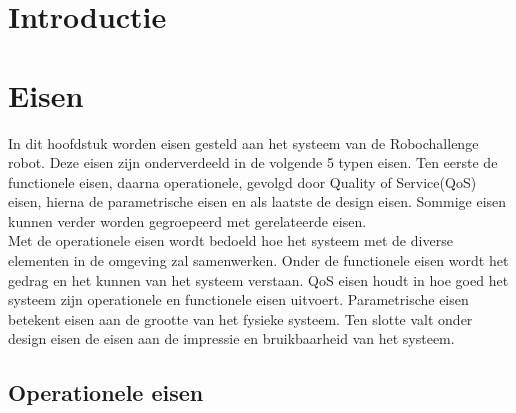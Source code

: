 \documentclass[12pt]{article} %
\begin{document}
\tableofcontents
\newpage
{}
\clearpage
\section{Introductie}
\label{sec:introduction}
\lipsum[0-3]
\newpage

\section{Eisen}
\label{sec:requirements}
In dit hoofdstuk worden eisen gesteld aan het systeem van de Robochallenge robot. Deze eisen zijn onderverdeeld in de volgende 5 typen eisen. Ten eerste de functionele eisen, daarna operationele, gevolgd door Quality of Service(QoS) eisen, hierna de parametrische eisen en als laatste de design eisen. Sommige eisen kunnen verder worden gegroepeerd met gerelateerde eisen.\\
Met de operationele eisen wordt bedoeld hoe het systeem met de diverse elementen in de omgeving zal samenwerken. 
Onder de functionele eisen wordt het gedrag en het kunnen van het systeem verstaan.
QoS eisen houdt in hoe goed het systeem zijn operationele en functionele eisen uitvoert.
Parametrische eisen betekent eisen aan de grootte van het fysieke systeem. 
Ten slotte valt onder design eisen de eisen aan de impressie en bruikbaarheid van het systeem.

\subsection{Operationele eisen}
\end{document}
